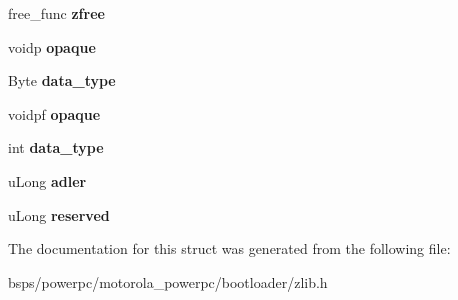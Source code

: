 \begin{DoxyCompactItemize}
\mbox{\label{structz__stream__s_a89eb750ade7f4f0b56bfdadf13344982}} 
free\+\_\+func {\bfseries zfree}
\item 
\mbox{\label{structz__stream__s_ab8ea3c4dcc2814b1b5897a97f2797d43}} 
voidp {\bfseries opaque}
\item 
\mbox{\label{structz__stream__s_a20b94e18c02aa248e1a0a058e56b47eb}} 
Byte {\bfseries data\+\_\+type}
\item 
\mbox{\label{structz__stream__s_ab72467f908d2ce65d5b42ee6556ef8bb}} 
voidpf {\bfseries opaque}
\item 
\mbox{\label{structz__stream__s_a9d8f63877d7639a8bca60f9fc3704fc4}} 
int {\bfseries data\+\_\+type}
\item 
\mbox{\label{structz__stream__s_ade2217fe31e671be1257731883201223}} 
u\+Long {\bfseries adler}
\item 
\mbox{\label{structz__stream__s_add73791dd19b49c9c68f3f3d328c37db}} 
u\+Long {\bfseries reserved}
\end{DoxyCompactItemize}


The documentation for this struct was generated from the following file\+:\begin{DoxyCompactItemize}
\item 
bsps/powerpc/motorola\+\_\+powerpc/bootloader/zlib.\+h\end{DoxyCompactItemize}

